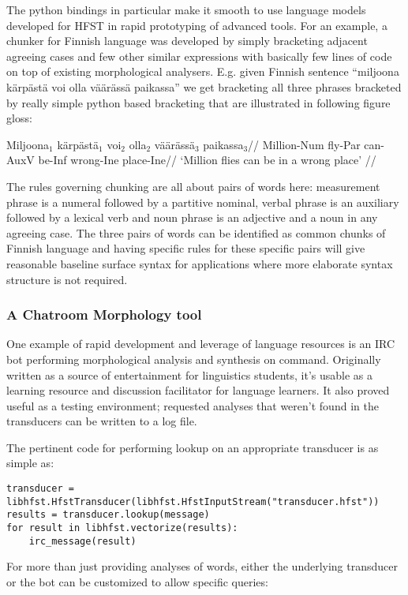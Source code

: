 \documentclass{llncs}
\begin{document}
The python bindings in particular make it smooth to use language models
developed for HFST in rapid prototyping of advanced tools. For an example, a
chunker for Finnish language was developed by simply bracketing adjacent
agreeing cases and few other similar expressions with basically few lines of
code on top of existing morphological analysers. E.g.  given Finnish sentence
``miljoona kärpästä voi olla väärässä paikassa'' we get bracketing all three
phrases bracketed by really simple python based bracketing that are illustrated
in following figure gloss:

\ex
\begingl
\gla Miljoona$_1$ kärpästä$_1$ voi$_2$ olla$_2$ väärässä$_3$ paikassa$_3$//
\glb Million-{\sc Num} fly-{\sc Par} can-{\sc AuxV} be-{\sc Inf} wrong-{\sc Ine} place-{\sc Ine}//
\glft `Million flies can be in a wrong place' //
\endgl
\xe

The rules governing chunking are all about pairs of words here: measurement
phrase is a numeral followed by a partitive nominal, verbal phrase is an
auxiliary followed by a lexical verb and noun phrase is an adjective and a noun
in any agreeing case.  The three pairs of words can be identified as common
chunks of Finnish language and having specific rules for these specific pairs
will give reasonable baseline surface syntax for applications where more
elaborate syntax structure is not required.

\subsubsection{A Chatroom Morphology tool}
One example of rapid development and leverage of language resources is
an IRC bot performing morphological analysis and synthesis on command.
Originally written as a source of entertainment for linguistics students,
it's usable as a learning resource and discussion facilitator for
language learners. It also proved useful as a testing environment;
requested analyses that weren't found in the transducers can be written to a
log file.

The pertinent code for performing lookup on an appropriate transducer
is as simple as:

\begin{verbatim}
transducer = libhfst.HfstTransducer(libhfst.HfstInputStream("transducer.hfst"))
results = transducer.lookup(message)
for result in libhfst.vectorize(results):
    irc_message(result)
\end{verbatim}

For more than just providing analyses of words, either the underlying transducer
or the bot can be customized to allow
specific queries:
\end{document}
